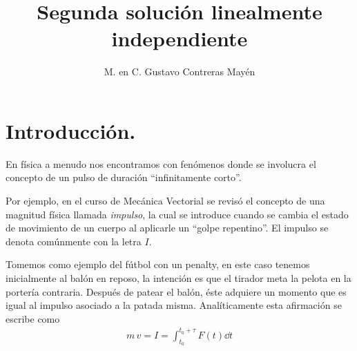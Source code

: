 
\title{Segunda solución linealmente independiente} \vspace{-3ex}
\author{M. en C. Gustavo Contreras Mayén}
\date{ }
\newcommand{\Cancel}[2][black]{{\color{#1}\cancel{\color{black}#2}}}

\vspace{-4cm}
\maketitle
\fontsize{14}{14}\selectfont
\tableofcontents
\newpage

\section{Introducción.}

En física a menudo nos encontramos con fenómenos donde se involucra el concepto de un pulso de duración \enquote{infinitamente corto}.
\par
Por ejemplo, en el curso de Mecánica Vectorial se revisó el concepto de una magnitud física llamada \emph{impulso}, la cual se introduce cuando se cambia el estado de movimiento de un cuerpo al aplicarle un \enquote{golpe repentino}. El impulso se denota comúnmente con la letra $I$.
\par
Tomemos como ejemplo del fútbol con un penalty, en este caso tenemos inicialmente al balón en reposo, la intención es que el tirador meta la pelota en la portería contraria. Después de patear el balón, éste adquiere un momento que es igual al impulso asociado a la patada misma. Analíticamente esta afirmación se escribe como
\begin{align*}
m \, v = I = \int_{t_{0}}^{t_{0} + \tau} F(t) \dd{t}
\end{align*}

